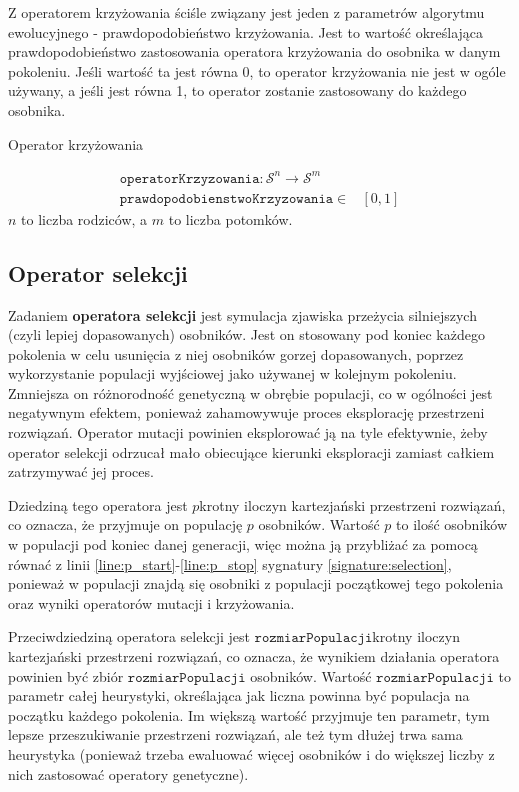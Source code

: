 \documentclass[twoside]{iisthesis}
\newcommand{\important}{\mathcal}
\newcommand{\param}{\mathtt}
\begin{document}
Z operatorem krzyżowania ściśle związany jest jeden z parametrów algorytmu ewolucyjnego - prawdopodobieństwo krzyżowania. Jest to wartość określająca prawdopodobieństwo zastosowania operatora krzyżowania do osobnika w danym pokoleniu. Jeśli wartość ta jest równa 0, to operator krzyżowania nie jest w ogóle używany, a jeśli jest równa 1, to operator zostanie zastosowany do każdego osobnika.

\begin{signature}
	\caption{Operator krzyżowania \label{signature:crossover}}
	\begin{align}
	\param{operatorKrzyzowania}: \important{S}^n \rightarrow \important{S}^m \\
	\param{prawdopodobienstwoKrzyzowania} \in &[0, 1]
	\end{align}
	$n$ to liczba rodziców, a $m$ to liczba potomków.
\end{signature}	

\subsection{Operator selekcji} \label{subsection:natSel}

Zadaniem \textbf{operatora selekcji} jest symulacja zjawiska przeżycia silniejszych (czyli lepiej dopasowanych) osobników. Jest on stosowany pod koniec każdego pokolenia w celu usunięcia z niej osobników gorzej dopasowanych, poprzez wykorzystanie populacji wyjściowej jako używanej w kolejnym pokoleniu. Zmniejsza on różnorodność genetyczną w obrębie populacji, co w ogólności jest negatywnym efektem, ponieważ zahamowywuje proces eksplorację przestrzeni rozwiązań. Operator mutacji powinien eksplorować ją na tyle efektywnie, żeby operator selekcji odrzucał mało obiecujące kierunki eksploracji zamiast całkiem zatrzymywać jej proces.

Dziedziną tego operatora jest $p$krotny iloczyn kartezjański przestrzeni rozwiązań, co oznacza, że przyjmuje on populację $p$ osobników. Wartość $p$ to ilość osobników w populacji pod koniec danej generacji, więc można ją przybliżać za pomocą równać z linii \ref{line:p_start}-\ref{line:p_stop} sygnatury \ref{signature:selection}, ponieważ w populacji znajdą się osobniki z populacji początkowej tego pokolenia oraz wyniki operatorów mutacji i krzyżowania. 

Przeciwdziedziną operatora selekcji jest $\param{rozmiarPopulacji}$krotny iloczyn kartezjański przestrzeni rozwiązań, co oznacza, że wynikiem działania operatora powinien być zbiór $\param{rozmiarPopulacji}$ osobników. Wartość $\param{rozmiarPopulacji}$ to parametr całej heurystyki, określająca jak liczna powinna być populacja na początku każdego pokolenia. Im większą wartość przyjmuje ten parametr, tym lepsze przeszukiwanie przestrzeni rozwiązań, ale też tym dłużej trwa sama heurystyka (ponieważ trzeba ewaluować więcej osobników i do większej liczby z nich zastosować operatory genetyczne). 
\end{document}

